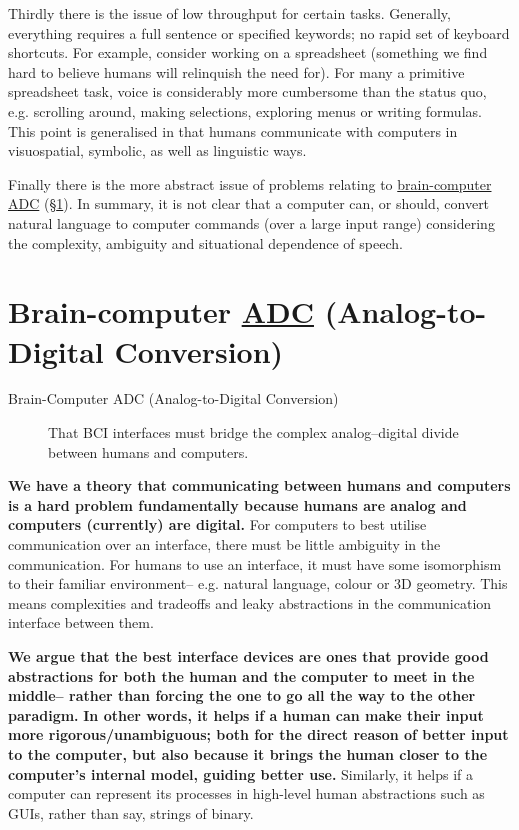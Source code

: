 \documentclass[logo,bsc,singlespacing,parskip]{infthesis}
\begin{document}
Thirdly there is the issue of low throughput for certain tasks.
Generally, everything requires a full sentence or specified keywords; no rapid set of keyboard shortcuts.
For example, consider working on a spreadsheet (something we find hard to believe humans will relinquish the need for).
For many a primitive spreadsheet task, voice is considerably more cumbersome than the status quo, e.g. scrolling around, making selections, exploring menus or writing formulas.
This point is generalised in that humans communicate with computers in visuospatial, symbolic, as well as linguistic ways.

Finally there is the more abstract issue of problems relating to \hyperref[sec:org7b0cd10]{brain-computer ADC} (\S \ref{sec:org7b0cd10}).
In summary, it is not clear that a computer can, or should, convert natural language to computer commands (over a large input range) considering the complexity, ambiguity and situational dependence of speech.

\section{Brain-computer \hyperref[org44fccbb]{ADC} (Analog-to-Digital Conversion)}
\label{sec:org7b0cd10}
\medskip
\begin{mdframed}
\begin{description}
\item[{Brain-Computer \label{org44fccbb}ADC (Analog-to-Digital Conversion)}] That BCI interfaces must bridge the complex analog--digital divide between humans and computers.
\end{description}
\end{mdframed}


\textbf{We have a theory that communicating between humans and computers is a hard problem fundamentally because humans are analog and computers (currently) are digital.}
For computers to best utilise communication over an interface, there must be little ambiguity in the communication.
For humans to use an interface, it must have some isomorphism to their familiar environment-- e.g. natural language, colour or 3D geometry.
This means complexities and tradeoffs and leaky abstractions in the communication interface between them.

\textbf{We argue that the best interface devices are ones that provide good abstractions for both the human and the computer to meet in the middle-- rather than forcing the one to go all the way to the other paradigm.}
\textbf{In other words, it helps if a human can make their input more rigorous/unambiguous; both for the direct reason of better input to the computer, but also because it brings the human closer to the computer's internal model, guiding better use.}
Similarly, it helps if a computer can represent its processes in high-level human abstractions such as GUIs, rather than say, strings of binary.
\end{document}
